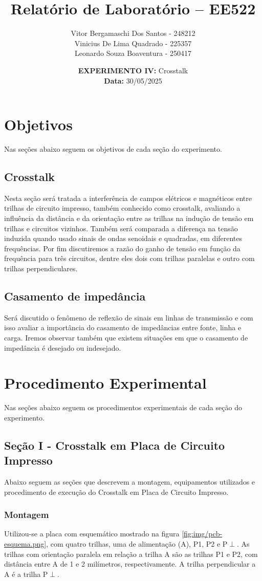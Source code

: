 \documentclass[12pt]{article}
\author{
  Vitor Bergamaschi Dos Santos - 248212\\
  Vinicius De Lima Quadrado - 225357\\
  Leonardo Souza Boaventura - 250417
}
\title{\textbf{Relatório de Laboratório -- EE522}}
\date{\textbf{EXPERIMENTO IV:} Crosstalk
\\ \textbf{Data:} 30/05/2025}
\begin{document}
\maketitle

\section{Objetivos}
Nas seções abaixo seguem os objetivos de cada seção do experimento.

\subsection{Crosstalk}
Nesta seção será tratada a interferência de campos elétricos e
magnéticos entre trilhas de circuito impresso, também conhecido como
crosstalk, avaliando a influência da distância e da orientação entre
as trilhas na indução de tensão em trilhas e circuitos vizinhos.
Também será comparada a diferença na tensão induzida quando usado
sinais de ondas senoidais e quadradas, em diferentes frequências.
Por fim discutiremos a razão do ganho de tensão em função da
frequência para três circuitos, dentre eles dois com trilhas
paralelas e outro com trilhas perpendiculares.

\subsection{Casamento de impedância}
Será discutido o fenômeno de reflexão de sinais em linhas de
transmissão e com isso avaliar a importância do casamento de
impedâncias entre fonte, linha e carga. Iremos observar também que
existem situações em que o casamento de impedância é desejado ou indesejado.

\section{Procedimento Experimental}
Nas seções abaixo seguem os procedimentos experimentais de cada seção
do experimento.

\subsection{Seção I - Crosstalk em Placa de Circuito Impresso}

Abaixo seguem as seções que descrevem a montagem, equipamentos
utilizados e procedimento de execução do Crosstalk em Placa de
Circuito Impresso.

\subsubsection{Montagem}
Utilizou-se a placa com esquemático mostrado na figura
\ref{fig:img/pcb-esquema.png}, com quatro
trilhas, uma de alimentação (A), P1, P2 e P$\perp$.
As trilhas com orientação paralela em relação a trilha A são as
trilhas P1 e P2, com distância entre A de 1 e 2 milímetros,
respectivamente. A trilha perpendicular a A é a trilha P$\perp$.
\end{document}
